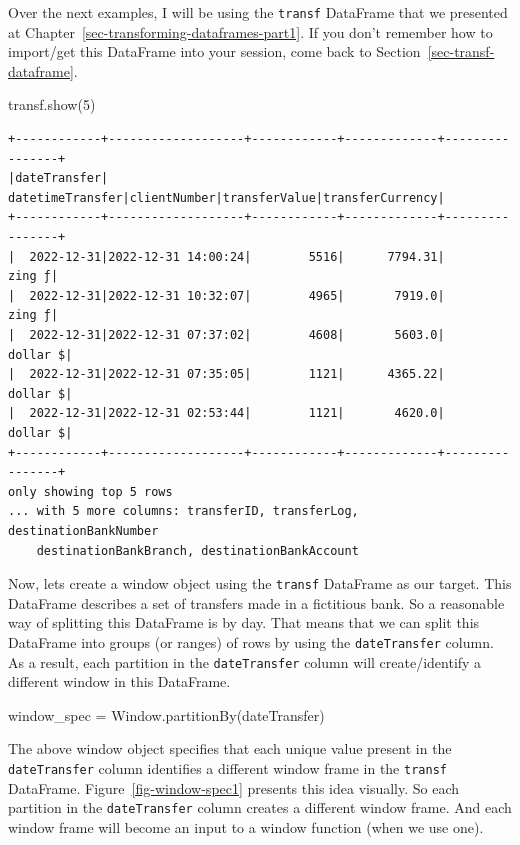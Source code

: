 \documentclass[
  11pt,
  letterpaper,
  DIV=11,
  numbers=noendperiod]{scrreprt}
\newenvironment{Shaded}{\begin{snugshade}}{\end{snugshade}}
\newcommand{\DecValTok}[1]{\textcolor[rgb]{0.68,0.00,0.00}{#1}}
\newcommand{\NormalTok}[1]{\textcolor[rgb]{0.00,0.23,0.31}{#1}}
\newcommand{\OperatorTok}[1]{\textcolor[rgb]{0.37,0.37,0.37}{#1}}
\newcommand{\StringTok}[1]{\textcolor[rgb]{0.13,0.47,0.30}{#1}}
\begin{document}
Over the next examples, I will be using the \texttt{transf} DataFrame
that we presented at Chapter~\ref{sec-transforming-dataframes-part1}. If
you don't remember how to import/get this DataFrame into your session,
come back to Section~\ref{sec-transf-dataframe}.

\begin{Shaded}
\begin{Highlighting}[]
\NormalTok{transf.show(}\DecValTok{5}\NormalTok{)}
\end{Highlighting}
\end{Shaded}

\begin{verbatim}
+------------+-------------------+------------+-------------+----------------+
|dateTransfer|   datetimeTransfer|clientNumber|transferValue|transferCurrency|
+------------+-------------------+------------+-------------+----------------+
|  2022-12-31|2022-12-31 14:00:24|        5516|      7794.31|          zing ƒ|
|  2022-12-31|2022-12-31 10:32:07|        4965|       7919.0|          zing ƒ|
|  2022-12-31|2022-12-31 07:37:02|        4608|       5603.0|        dollar $|
|  2022-12-31|2022-12-31 07:35:05|        1121|      4365.22|        dollar $|
|  2022-12-31|2022-12-31 02:53:44|        1121|       4620.0|        dollar $|
+------------+-------------------+------------+-------------+----------------+
only showing top 5 rows
... with 5 more columns: transferID, transferLog, destinationBankNumber
    destinationBankBranch, destinationBankAccount
\end{verbatim}

Now, lets create a window object using the \texttt{transf} DataFrame as
our target. This DataFrame describes a set of transfers made in a
fictitious bank. So a reasonable way of splitting this DataFrame is by
day. That means that we can split this DataFrame into groups (or ranges)
of rows by using the \texttt{dateTransfer} column. As a result, each
partition in the \texttt{dateTransfer} column will create/identify a
different window in this DataFrame.

\begin{Shaded}
\begin{Highlighting}[]
\NormalTok{window\_spec }\OperatorTok{=}\NormalTok{ Window.partitionBy(}\StringTok{\textquotesingle{}dateTransfer\textquotesingle{}}\NormalTok{)}
\end{Highlighting}
\end{Shaded}

The above window object specifies that each unique value present in the
\texttt{dateTransfer} column identifies a different window frame in the
\texttt{transf} DataFrame. Figure~\ref{fig-window-spec1} presents this
idea visually. So each partition in the \texttt{dateTransfer} column
creates a different window frame. And each window frame will become an
input to a window function (when we use one).
\end{document}
